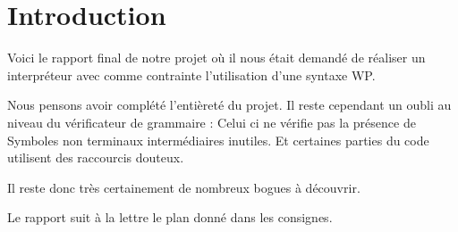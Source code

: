 \chapter*{Introduction}
	Voici le rapport final de notre projet où il nous était demandé de
	réaliser un interpréteur avec comme contrainte l'utilisation d'une
	syntaxe WP. 

	Nous pensons avoir complété l'entièreté du projet. Il reste cependant
	un oubli au niveau du vérificateur de grammaire : Celui ci ne vérifie
	pas la présence de Symboles non terminaux intermédiaires inutiles. Et
	certaines parties du code utilisent des raccourcis douteux. 
	
	Il reste donc très certainement de nombreux bogues à découvrir.

	Le rapport suit à la lettre le plan donné dans les consignes. 

